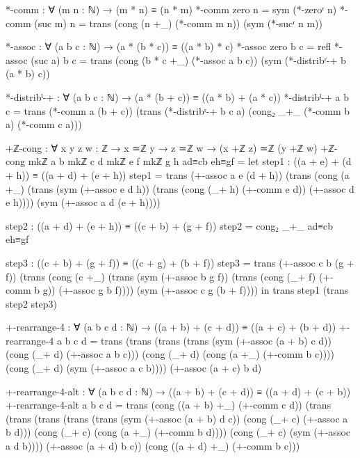 \documentclass[11pt,a4paper]{book}
\begin{document}
\begin{code}
*-comm : ∀ (m n : ℕ) → (m * n) ≡ (n * m)
*-comm zero    n = sym (*-zeroʳ n)
*-comm (suc m) n = trans (cong (n +_) (*-comm m n)) (sym (*-sucʳ n m))

*-assoc : ∀ (a b c : ℕ) → (a * (b * c)) ≡ ((a * b) * c)
*-assoc zero b c = refl
*-assoc (suc a) b c = 
  trans (cong (b * c +_) (*-assoc a b c)) (sym (*-distribʳ-+ b (a * b) c))

*-distribˡ-+ : ∀ (a b c : ℕ) → (a * (b + c)) ≡ ((a * b) + (a * c))
*-distribˡ-+ a b c = 
  trans (*-comm a (b + c))
        (trans (*-distribʳ-+ b c a)
               (cong₂ _+_ (*-comm b a) (*-comm c a)))

+ℤ-cong : ∀ {x y z w : ℤ} → x ≃ℤ y → z ≃ℤ w → (x +ℤ z) ≃ℤ (y +ℤ w)
+ℤ-cong {mkℤ a b} {mkℤ c d} {mkℤ e f} {mkℤ g h} ad≡cb eh≡gf =
  let
    step1 : ((a + e) + (d + h)) ≡ ((a + d) + (e + h))
    step1 = trans (+-assoc a e (d + h)) 
            (trans (cong (a +_) (trans (sym (+-assoc e d h)) 
                   (trans (cong (_+ h) (+-comm e d)) (+-assoc d e h))))
            (sym (+-assoc a d (e + h))))
    
    step2 : ((a + d) + (e + h)) ≡ ((c + b) + (g + f))
    step2 = cong₂ _+_ ad≡cb eh≡gf
    
    step3 : ((c + b) + (g + f)) ≡ ((c + g) + (b + f))
    step3 = trans (+-assoc c b (g + f))
            (trans (cong (c +_) (trans (sym (+-assoc b g f))
                   (trans (cong (_+ f) (+-comm b g)) (+-assoc g b f))))
            (sym (+-assoc c g (b + f))))
  in trans step1 (trans step2 step3)

+-rearrange-4 : ∀ (a b c d : ℕ) → ((a + b) + (c + d)) ≡ ((a + c) + (b + d))
+-rearrange-4 a b c d =
  trans (trans (trans (trans (sym (+-assoc (a + b) c d))
                             (cong (_+ d) (+-assoc a b c)))
                      (cong (_+ d) (cong (a +_) (+-comm b c))))
                (cong (_+ d) (sym (+-assoc a c b))))
        (+-assoc (a + c) b d)

+-rearrange-4-alt : ∀ (a b c d : ℕ) → ((a + b) + (c + d)) ≡ ((a + d) + (c + b))
+-rearrange-4-alt a b c d =
  trans (cong ((a + b) +_) (+-comm c d))
        (trans (trans (trans (trans (trans (sym (+-assoc (a + b) d c))
                                            (cong (_+ c) (+-assoc a b d)))
                                     (cong (_+ c) (cong (a +_) (+-comm b d))))
                              (cong (_+ c) (sym (+-assoc a d b))))
                       (+-assoc (a + d) b c))
               (cong ((a + d) +_) (+-comm b c)))


\end{code}
\end{document}
